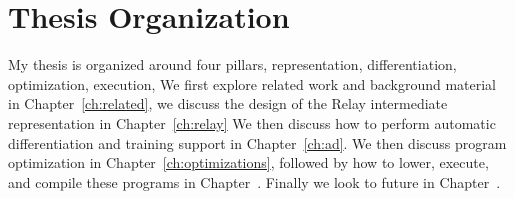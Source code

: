 \section{Thesis Organization}

My thesis is organized around four pillars, representation, differentiation, optimization, execution,
We first explore related work and background material in Chapter~\ref{ch:related},
  we discuss the design of the Relay intermediate representation in Chapter~\ref{ch:relay}
We then discuss how to perform automatic differentiation and training support in Chapter~\ref{ch:ad}.
We then discuss program optimization in Chapter~\ref{ch:optimizations},
  followed by how to lower, execute, and compile these programs in
  Chapter~.
Finally we look to future in Chapter~.




